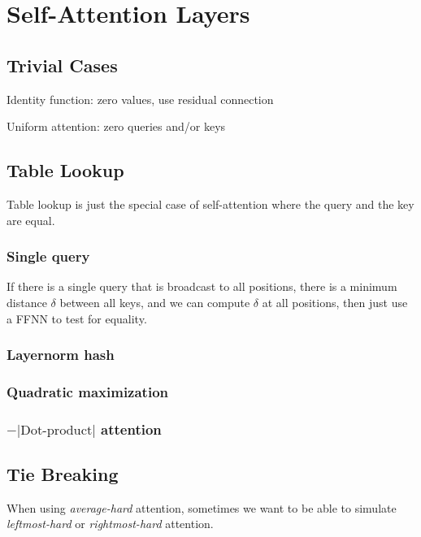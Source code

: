 %
\chapter{Self-Attention Layers}
%

\section{Trivial Cases}

Identity function: zero values, use residual connection

Uniform attention: zero queries and/or keys

\section{Table Lookup}

Table lookup is just the special case of self-attention where the query and the key are equal.

\subsection{Single query}

If there is a single query that is broadcast to all positions, 
there is a minimum distance $\delta$ between all keys, and we can compute $\delta$ at all positions,
then just use a FFNN to test for equality.

\citep{chiang-cholak-2022-parity}

\subsection{Layernorm hash}

\citep{merrill-sabharwal-2024-cot}

\subsection{Quadratic maximization}

\citep{barcelo-etal-2024-logical}

\subsection{$-|\text{Dot-product}|$ attention}

\citep{perez-etal-2021-turing}

\section{Tie Breaking}

When using \emph{average-hard} attention, sometimes we want to be able to simulate \emph{leftmost-hard} or \emph{rightmost-hard} attention.
